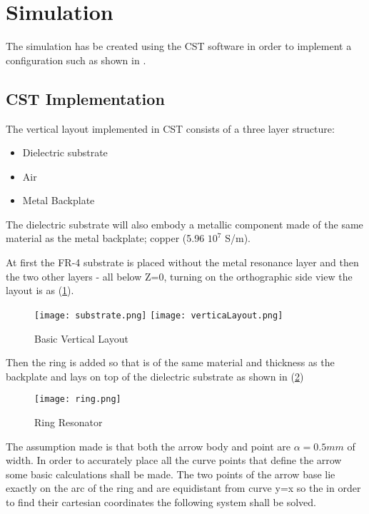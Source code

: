 \section{\textsf{Simulation}}
    The simulation has be created using the CST software in order to implement a
    configuration such as shown in \cite{zhang_design_2023}.

    \subsection{\textsf{CST Implementation}}
        The vertical layout implemented in CST consists of a three layer structure:
        \begin{itemize}
            \item Dielectric substrate
            \item Air
            \item Metal Backplate
        \end{itemize}

        The dielectric substrate will also embody a metallic component made of the same
        material as the metal backplate; copper (5.96 \mu $10^7$ S/m).

        At first the FR-4 substrate is placed without the metal resonance layer and then
        the two other layers - all below Z=0, turning on the orthographic side view the
        layout is as (\ref{img:layout}).
        \begin{figure}[h]
            \centering
            \texttt{[image: substrate.png]}\hfil
            \texttt{[image: verticaLayout.png]}
            \caption{Basic Vertical Layout}
            \label{img:layout}
        \end{figure}

        Then the ring is added so that is of the same material and thickness as the backplate and lays
        on top of the dielectric substrate as shown in (\ref{img:ring}) 
        \begin{figure}[h]
            \centering
            \texttt{[image: ring.png]}
            \caption{Ring Resonator}
            \label{img:ring}
        \end{figure}

        The assumption made is that both the arrow body and point are $\alpha=0.5mm$ of width.
        In order to accurately place all the curve points that define the arrow some basic calculations
        shall be made. The two points of the arrow base lie exactly on the arc of the ring and are 
        equidistant from curve y=x so the in order to find their cartesian coordinates the following
        system shall be solved. 

